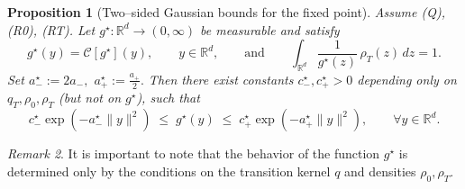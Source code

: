 \documentclass[11pt]{article}
\newtheorem{proposition}{Proposition}[section] %
\theoremstyle{remark}
\newtheorem{remark}[proposition]{Remark}
\numberwithin{equation}{section}
\def\aStarmin{a_{-}^\star}
\def\aStarmax{a_{+}^\star}
\def\cStarmin{c_{-}^\star}
\def\cStarmax{c_{+}^\star}
\begin{document}
\begin{proposition}[Two--sided Gaussian bounds for the fixed point]
\label{prop:g-two-sided-subgaussian-direct}
Assume \emph{(Q)}, \emph{(R0)}, \emph{(RT)}. Let $g^\star:\mathbb{R}^d\to(0,\infty)$ be measurable and satisfy
\begin{equation}\label{eq:fixed-point-normalization}
  g^\star(y) = \mathcal{C}[g^\star](y), \qquad y\in\mathbb{R}^d,
  \qquad\text{and}\qquad
  \int_{\mathbb{R}^d} \frac{1}{g^\star(z)}\,\rho_T(z)\,dz = 1.
\end{equation}
Set \(\aStarmin := 2a_-,\) \(\aStarmax := \frac{a_+}{2}.\)
Then there exist constants $\cStarmin, \cStarmax>0$ depending only on
$q_T,\rho_0,\rho_T$ (but not on $g^\star$), such that
\begin{equation}\label{eq:g-two-sided-Gaussian}
  \cStarmin \exp(-\aStarmin \|y\|^2)
  \;\le\;
  g^\star(y)
  \;\le\;
  \cStarmax \exp(-\aStarmax \|y\|^2),
  \qquad \forall y\in\mathbb{R}^d.
\end{equation}
\end{proposition}

\begin{remark}
    It is important to note that the behavior of the function $g^\star$ is determined only by the conditions on the transition kernel $q$ and densities $\rho_0, \rho_T$.
\end{remark}
\end{document}
